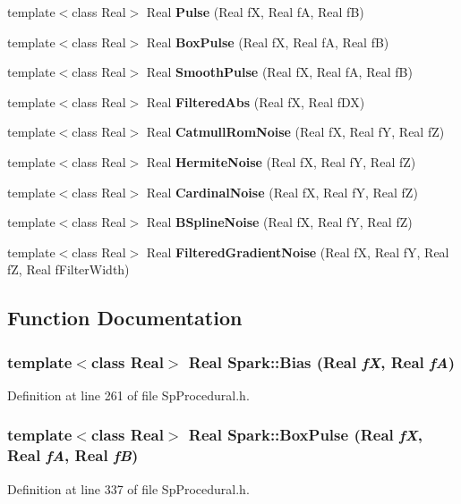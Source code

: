\begin{CompactItemize}
\item 
template$<$class Real$>$ Real {\bf Pulse} (Real f\-X, Real f\-A, Real f\-B)
\item 
template$<$class Real$>$ Real {\bf Box\-Pulse} (Real f\-X, Real f\-A, Real f\-B)
\item 
template$<$class Real$>$ Real {\bf Smooth\-Pulse} (Real f\-X, Real f\-A, Real f\-B)
\item 
template$<$class Real$>$ Real {\bf Filtered\-Abs} (Real f\-X, Real f\-DX)
\item 
template$<$class Real$>$ Real {\bf Catmull\-Rom\-Noise} (Real f\-X, Real f\-Y, Real f\-Z)
\item 
template$<$class Real$>$ Real {\bf Hermite\-Noise} (Real f\-X, Real f\-Y, Real f\-Z)
\item 
template$<$class Real$>$ Real {\bf Cardinal\-Noise} (Real f\-X, Real f\-Y, Real f\-Z)
\item 
template$<$class Real$>$ Real {\bf BSpline\-Noise} (Real f\-X, Real f\-Y, Real f\-Z)
\item 
template$<$class Real$>$ Real {\bf Filtered\-Gradient\-Noise} (Real f\-X, Real f\-Y, Real f\-Z, Real f\-Filter\-Width)
\end{CompactItemize}


\subsection{Function Documentation}
\subsubsection{\setlength{\rightskip}{0pt plus 5cm}template$<$class Real$>$ Real Spark::Bias (Real {\em f\-X}, Real {\em f\-A})}\label{namespaceSpark_a96}


Definition at line 261 of file Sp\-Procedural.h.
\subsubsection{\setlength{\rightskip}{0pt plus 5cm}template$<$class Real$>$ Real Spark::Box\-Pulse (Real {\em f\-X}, Real {\em f\-A}, Real {\em f\-B})}\label{namespaceSpark_a104}


Definition at line 337 of file Sp\-Procedural.h.
